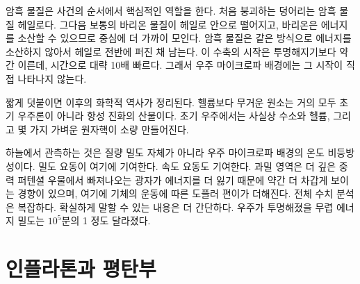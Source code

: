 암흑 물질은 사건의 순서에서 핵심적인 역할을 한다. 처음 붕괴하는 덩어리는 암흑 물질 헤일로다. 그다음 보통의 바리온 물질이 헤일로 안으로 떨어지고, 바리온은 에너지를 소산할 수 있으므로 중심에 더 가까이 모인다. 암흑 물질은 같은 방식으로 에너지를 소산하지 않아서 헤일로 전반에 퍼진 채 남는다. 이 수축의 시작은 투명해지기보다 약간 이른데, 시간으로 대략 10배 빠르다. 그래서 우주 마이크로파 배경에는 그 시작이 직접 나타나지 않는다.

짧게 덧붙이면 이후의 화학적 역사가 정리된다. 헬륨보다 무거운 원소는 거의 모두 초기 우주론이 아니라 항성 진화의 산물이다. 초기 우주에서는 사실상 수소와 헬륨, 그리고 몇 가지 가벼운 원자핵이 소량 만들어진다.

하늘에서 관측하는 것은 질량 밀도 자체가 아니라 우주 마이크로파 배경의 온도 비등방성이다. 밀도 요동이 여기에 기여한다. 속도 요동도 기여한다. 과밀 영역은 더 깊은 중력 퍼텐셜 우물에서 빠져나오는 광자가 에너지를 더 잃기 때문에 약간 더 차갑게 보이는 경향이 있으며, 여기에 기체의 운동에 따른 도플러 편이가 더해진다. 전체 수치 분석은 복잡하다. 확실하게 말할 수 있는 내용은 더 간단하다. 우주가 투명해졌을 무렵 에너지 밀도는 \(10^5\)분의 1 정도 달라졌다.

\begin{classroomqa}
\end{classroomqa}

\begin{classroomqa}
\end{classroomqa}

\begin{classroomqa}
\end{classroomqa}

\section{인플라톤과 평탄부}

